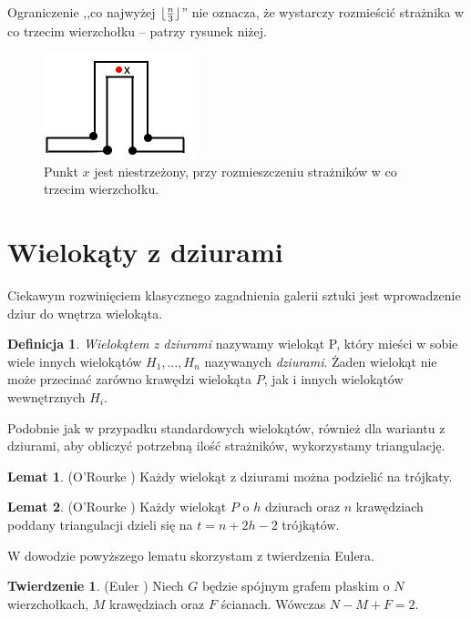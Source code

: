 \documentclass[brudnopis]{xmgr}
\DeclarePairedDelimiter\floor{\lfloor}{\rfloor}
\theoremstyle{definition}
\newtheorem{Twierdzenie}{Twierdzenie}
\newtheorem{Lemat}{Lemat}
\newtheorem{Definicja}{Definicja}
\begin{document}
\indent Ograniczenie ,,co najwyżej $\floor{\frac{n}{3}}$'' nie oznacza, że wystarczy rozmieścić strażnika w co trzecim wierzchołku -- patrzy rysunek niżej.
\begin{figure}[ht!]
  \centering
  \includegraphics{rysunki/co_trzeci.png}
  \caption{Punkt $x$ jest niestrzeżony, przy rozmieszczeniu strażników w co trzecim wierzchołku.}
\end{figure} 

\section{Wielokąty z dziurami}
Ciekawym rozwinięciem klasycznego zagadnienia galerii sztuki jest wprowadzenie dziur do wnętrza wielokąta.

\begin{Definicja} \label{def wielokat z dziurami}
  \emph{Wielokątem z dziurami} nazywamy wielokąt P, który mieści w sobie wiele innych wielokątów $H_1, \ldots, H_n$ nazywanych \emph{dziurami}. Żaden wielokąt nie może przecinać zarówno krawędzi wielokąta $P$, jak i innych wielokątów wewnętrznych $H_i$.
\end{Definicja}

\indent Podobnie jak w przypadku standardowych wielokątów, również dla wariantu z dziurami, aby obliczyć potrzebną ilość strażników, wykorzystamy triangulację.

\begin{Lemat} (O'Rourke \cite{orourke})
  Każdy wielokąt z dziurami można podzielić na trójkaty.
\end{Lemat}

\begin{Lemat}\label{t trójkątów triangulacja} (O'Rourke \cite{orourke})
  Każdy wielokąt $P$ o $h$ dziurach oraz $n$ krawędziach poddany triangulacji dzieli się na $t = n + 2h - 2$ trójkątów.
\end{Lemat}

W dowodzie powyższego lematu skorzystam z twierdzenia Eulera.
\begin{Twierdzenie} \label{tw eulera} (Euler \cite{euler})
  Niech $G$ będzie spójnym grafem płaskim o $N$ wierzchołkach, $M$ krawędziach oraz $F$ ścianach. Wówczas $N - M + F = 2$.
\end{Twierdzenie}
\end{document}
